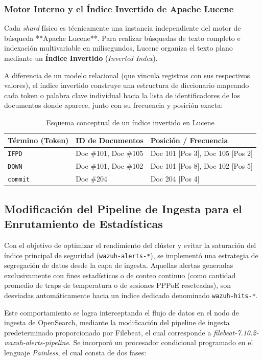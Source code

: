 \subsubsection{Motor Interno y el Índice Invertido de Apache Lucene}
Cada \textit{shard} físico es técnicamente una instancia independiente del motor de búsqueda **Apache Lucene**. Para realizar búsquedas de texto completo e indexación multivariable en milisegundos, Lucene organiza el texto plano mediante un \textbf{Índice Invertido} (\textit{Inverted Index}).

A diferencia de un modelo relacional (que vincula registros con sus respectivos valores), el índice invertido construye una estructura de diccionario mapeando cada token o palabra clave individual hacia la lista de identificadores de los documentos donde aparece, junto con su frecuencia y posición exacta:

\begin{table}[H]
\centering
\small
\caption{Esquema conceptual de un índice invertido en Lucene}
\label{tab:inverted_index_schema}
\begin{tabular}{|p{}|p{}|p{}|}
\hline
\textbf{Término (Token)} & \textbf{ID de Documentos} & \textbf{Posición / Frecuencia} \\ \hline
\texttt{IFPD} & Doc \#101, Doc \#105 & Doc 101 [Pos 3], Doc 105 [Pos 2] \\ \hline
\texttt{DOWN} & Doc \#101, Doc \#102 & Doc 101 [Pos 8], Doc 102 [Pos 5] \\ \hline
\texttt{commit} & Doc \#204 & Doc 204 [Pos 4] \\ \hline
\end{tabular}
\end{table}


\subsection{Modificación del Pipeline de Ingesta para el Enrutamiento de Estadísticas}
Con el objetivo de optimizar el rendimiento del clúster y evitar la saturación del índice principal de seguridad (\texttt{wazuh-alerts-*}), se implementó una estrategia de segregación de datos desde la capa de ingesta. Aquellas alertas generadas exclusivamente con fines estadísticos o de conteo continuo (como cantidad promedio de traps de temperatura o de sesiones PPPoE reseteadas), son desviadas automáticamente hacia un índice dedicado denominado \texttt{wazuh-hits-*}.

Este comportamiento se logra interceptando el flujo de datos en el nodo de ingesta de OpenSearch, mediante la modificación del pipeline de ingesta predeterminado proporcionado por Filebeat, el cual corresponde a \textit{filebeat-7.10.2-wazuh-alerts-pipeline}. Se incorporó un procesador condicional programado en el lenguaje \textit{Painless}, el cual consta de dos fases:

